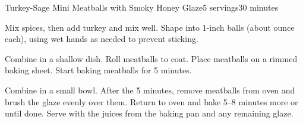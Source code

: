 \documentclass[../Cookbook.tex]{subfiles}
\begin{document}
\begin{recipe}{Turkey-Sage Mini Meatballs with Smoky Honey Glaze}{5 servings}{30 minutes}


Mix spices, then add turkey and mix well. Shape into 1-inch balls (about  ounce each), using wet hands as needed to prevent sticking.

Combine in a shallow dish. Roll meatballs to coat. Place meatballs on a rimmed baking sheet.
Start baking meatballs for 5 minutes.

Combine in a small bowl. After the 5 minutes, remove meatballs from oven and brush the glaze evenly over them. Return to oven and bake 5--8 minutes more or until done. Serve with the juices from the baking pan and any remaining glaze.

\end{recipe}
\end{document}
